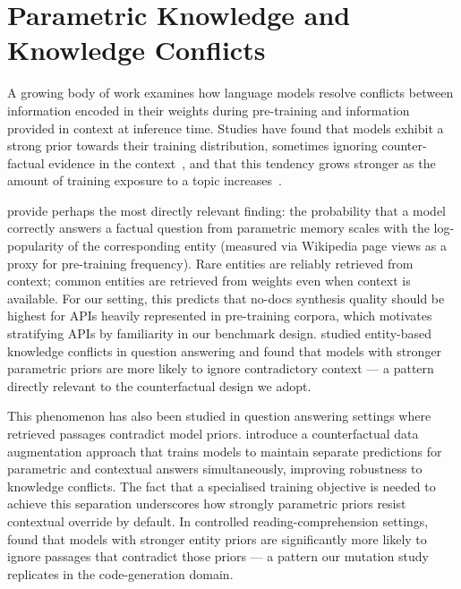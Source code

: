 \section{Parametric Knowledge and Knowledge Conflicts}
\label{sec:related_work:param_conflict}

A growing body of work examines how language models resolve conflicts between information encoded in their weights during pre-training and information provided in context at inference time. Studies have found that models exhibit a strong prior towards their training distribution, sometimes ignoring counter-factual evidence in the context~\citep{longpre2021entity}, and that this tendency grows stronger as the amount of training exposure to
a topic increases~\citep{mallen2023knowns}.

\citet{mallen2023knowns} provide perhaps the most directly
relevant finding: the probability that a model correctly answers a factual question from parametric memory scales with the log-popularity of the corresponding entity (measured via Wikipedia page views as a proxy for pre-training frequency). Rare entities are reliably retrieved from context; common entities are retrieved from weights even when context is available.
For our setting, this predicts that no-docs synthesis quality should be highest for APIs heavily represented in pre-training
corpora, which motivates stratifying APIs by familiarity in our benchmark design.
\citet{longpre2021entity} studied entity-based knowledge
conflicts in question answering and found that models with stronger parametric priors are more likely to ignore contradictory context --- a pattern directly relevant to the counterfactual design we adopt.

This phenomenon has also been studied in question answering settings where retrieved passages contradict model priors. \citet{neeman2022disentqa} introduce a counterfactual data augmentation approach that trains models to maintain separate predictions for parametric and contextual answers simultaneously, improving robustness to knowledge conflicts. The fact that a specialised training objective is needed to achieve this separation underscores how strongly parametric priors resist contextual override by default. In controlled reading-comprehension settings, \citet{longpre2021entity} found that models with stronger entity priors are significantly more likely to ignore passages that contradict those priors --- a pattern our mutation study replicates in the code-generation domain.

